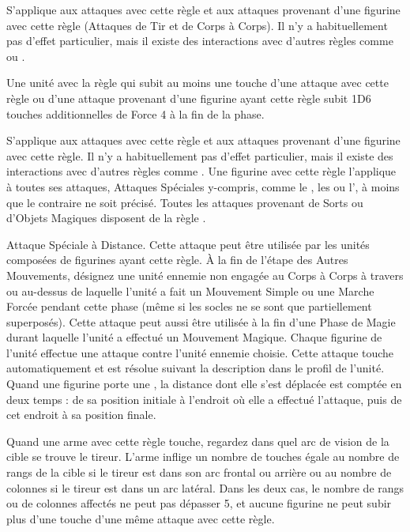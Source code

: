 
S'applique aux attaques avec cette règle et aux attaques provenant d'une figurine avec cette règle (Attaques de Tir et de Corps à Corps). Il n'y a habituellement pas d'effet particulier, mais il existe des interactions avec d'autres règles comme \flammable{} ou \regeneration{}.


Une unité avec la règle \fly{} qui subit au moins une touche d'une attaque avec cette règle ou d'une attaque provenant d'une figurine ayant cette règle subit 1D6 touches additionnelles de Force 4 à la fin de la phase.


S'applique aux attaques avec cette règle et aux attaques provenant d'une figurine avec cette règle. Il n'y a habituellement pas d'effet particulier, mais il existe des interactions avec d'autres règles comme \ethereal{}. Une figurine avec cette règle l'applique à toutes ses attaques, Attaques Spéciales y-compris, comme le \stomp{}, les \impacthits{} ou l'\breathweapon{}, à moins que le contraire ne soit précisé. Toutes les attaques provenant de Sorts ou d'Objets Magiques disposent de la règle \magicalattacks{}.


Attaque Spéciale à Distance. Cette attaque peut être utilisée par les unités composées de figurines ayant cette règle. À la fin de l'étape des Autres Mouvements, désignez une unité ennemie non engagée au Corps à Corps à travers ou au-dessus de laquelle l'unité a fait un Mouvement Simple ou une Marche Forcée pendant cette phase (même si les socles ne se sont que partiellement superposés). Cette attaque peut aussi être utilisée à la fin d'une Phase de Magie durant laquelle l'unité a effectué un Mouvement Magique. Chaque figurine de l'unité effectue une attaque contre l'unité ennemie choisie. Cette attaque touche automatiquement et est résolue suivant la description dans le profil de l'unité. Quand une figurine porte une \sweepingattack{}, la distance dont elle s'est déplacée est comptée en deux temps : de sa position initiale à l'endroit où elle a effectué l'attaque, puis de cet endroit à sa position finale.


Quand une arme avec cette règle touche, regardez dans quel arc de vision de la cible se trouve le tireur. L'arme inflige un nombre de touches égale au nombre de rangs de la cible si le tireur est dans son arc frontal ou arrière ou au nombre de colonnes si le tireur est dans un arc latéral. Dans les deux cas, le nombre de rangs ou de colonnes affectés ne peut pas dépasser 5, et aucune figurine ne peut subir plus d'une touche d'une même attaque avec cette règle.

